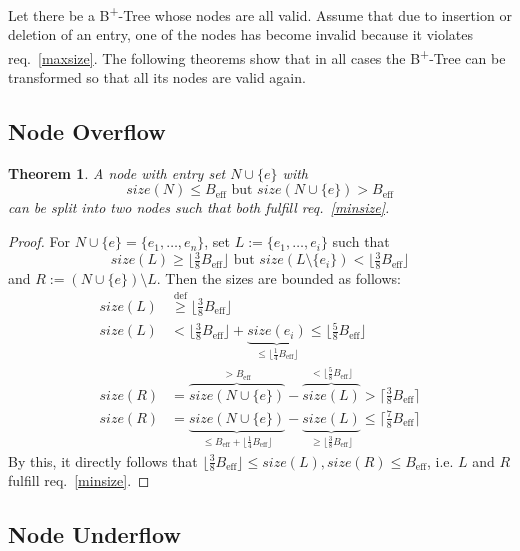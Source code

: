 \documentclass{vldb}
\newtheorem{thm}{Theorem}
\newcommand \Beff { B_{\text{eff}} }
\begin{document}
Let there be a B\textsuperscript{+}-Tree whose nodes are all valid.
Assume that due to insertion or deletion of an entry, one of the nodes has
become invalid because it violates req.~\ref{maxsize}.
The following theorems show that in all cases the B\textsuperscript{+}-Tree can
be transformed so that all its nodes are valid again.


\subsection*{Node Overflow}

\begin{thm}
A node with entry set \mbox{$N \cup \{ e \}$} with
\[ size(N) \leq \Beff \text{ but } size(N \cup \{e\}) > \Beff \]
can be split into two nodes such that both fulfill req.~\ref{minsize}.
\end{thm}

\begin{proof}
For \mbox{$N \cup \{e\} = \{ e_1, \ldots, e_n \}$}, set
\mbox{$L := \{ e_1, \ldots, e_i \}$} such that
\[ size(L) \geq \lfloor \tfrac{3}{8} \Beff \rfloor \text{ but }
    size(L \setminus \{e_i\}) < \lfloor \tfrac{3}{8} \Beff \rfloor \]
and \mbox{$R := (N \cup \{e\}) \setminus L$}.
Then the sizes are bounded as follows:
\begin{align*}
size(L) &\stackrel{\mathrm{def}}{\geq} \lfloor \tfrac{3}{8} \Beff \rfloor\\
size(L) &< \lfloor \tfrac{3}{8} \Beff \rfloor
        + \underbrace{size(e_i)}_{\leq \lfloor \frac{1}{4} \Beff \rfloor}
    \leq \lfloor \tfrac{5}{8} \Beff \rfloor\\
size(R) &= \overbrace{size(N \cup \{e\})}^{> \Beff}
        - \overbrace{size(L)}^{< \lfloor \frac{5}{8} \Beff \rfloor}
    > \lceil \tfrac{3}{8} \Beff \rceil\\
size(R) &= \underbrace{size(N \cup \{e\})}_{
            \leq \Beff + \lfloor \frac{1}{4} \Beff \rfloor}
        - \underbrace{size(L)}_{\geq \lfloor \frac{3}{8} \Beff \rfloor}
    \leq \lceil \tfrac{7}{8} \Beff \rceil
\end{align*}
By this, it directly follows that 
\mbox{$\lfloor \tfrac{3}{8} \Beff \rfloor \leq size(L), size(R) \leq \Beff$}, 
i.e.  $L$ and $R$ fulfill req.~\ref{minsize}.
\end{proof}


\subsection*{Node Underflow}
\end{document}
